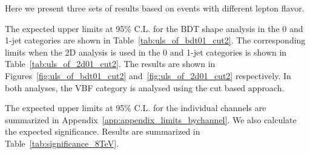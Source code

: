 Here we present three sets of results based on events with
different lepton flavor. 

The expected upper limits at 95\% C.L.
for the BDT shape analysis in the 0 and 1-jet categories
are shown in Table~\ref{tab:uls_of_bdt01_cut2}.
The corresponding limits when the 2D analysis is used 
in the 0 and 1-jet categories is shown in Table~\ref{tab:uls_of_2d01_cut2}.
The results are shown in Figures~\ref{fig:uls_of_bdt01_cut2} 
and~\ref{fig:uls_of_2d01_cut2} respectively.
In both analyses, the VBF category is analysed using the cut based approach.

The expected upper limits at 95\% C.L. for the individual channels 
are summarized in Appendix~\ref{app:appendix_limits_bychannel}. 
We also calculate the expected significance.
Results are summarized in Table~\ref{tab:significance_8TeV}.


